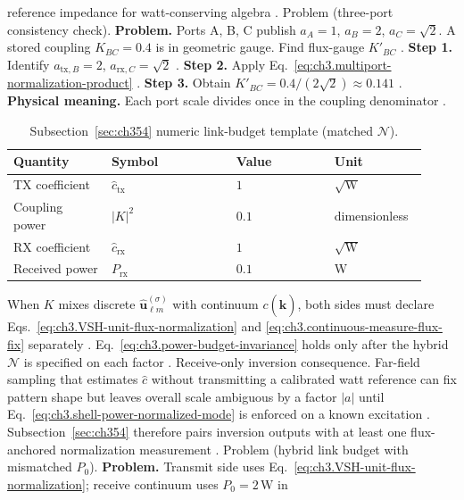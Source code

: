 reference impedance for watt-conserving algebra \cite{harrington2001}.
Problem (three-port consistency check). \textbf{Problem.} Ports A, B, C publish \(a_{A}=1\), \(a_{B}=2\), \(a_{C}=\sqrt{2}\). A stored coupling \(K_{BC}=0.4\) is in
geometric gauge. Find flux-gauge \(K'_{BC}\) \cite{harrington2001}.
\textbf{Step 1.} Identify \(a_{\mathrm{tx},B}=2\), \(a_{\mathrm{rx},C}=\sqrt{2}\) \cite{hansen1988}.
\textbf{Step 2.} Apply Eq.~\eqref{eq:ch3.multiport-normalization-product} \cite{harrington2001}.
\textbf{Step 3.} Obtain \(K'_{BC}=0.4/(2\sqrt{2})\approx0.141\) \cite{stratton1941}.
\textbf{Physical meaning.} Each port scale divides once in the coupling denominator \cite{poynting1884}.
\begin{table}[t]
\centering
\caption{Subsection~\ref{sec:ch354} numeric link-budget template (matched \(\mathcal{N}\)).}
\label{tab:ch3.354-link-budget-numeric}
\small
\begin{tabular}{@{}p{0.22\linewidth}p{0.28\linewidth}p{0.22\linewidth}p{0.20\linewidth}@{}}
\toprule
Quantity & Symbol & Value & Unit \\
\midrule
TX coefficient & $\widehat{c}_{\mathrm{tx}}$ & $1$ & $\sqrt{\mathrm{W}}$ \\
Coupling power & $|K|^{2}$ & $0.1$ & dimensionless \\
RX coefficient & $\widehat{c}_{\mathrm{rx}}$ & $1$ & $\sqrt{\mathrm{W}}$ \\
Received power & $P_{\mathrm{rx}}$ & $0.1$ & W \\
\bottomrule
\end{tabular}
\end{table}
When \(K\) mixes discrete \(\widehat{\mathbf{u}}_{\ell m}^{(\sigma)}\) with continuum \(c(\hat{\mathbf{k}})\), both sides must
declare Eqs.~\eqref{eq:ch3.VSH-unit-flux-normalization} and \eqref{eq:ch3.continuous-measure-flux-fix} separately
\cite{harrington2001}. Eq.~\eqref{eq:ch3.power-budget-invariance} holds only after the hybrid \(\mathcal{N}\) is
specified on each factor \cite{hansen1988}.
Receive-only inversion consequence. Far-field sampling that estimates \(\widehat{c}\) without transmitting a calibrated watt reference can fix pattern shape but leaves
overall scale ambiguous by a factor \(|a|\) until Eq.~\eqref{eq:ch3.shell-power-normalized-mode} is enforced on a known excitation
\cite{devaney2004}. Subsection~\ref{sec:ch354} therefore pairs inversion outputs with at least one
flux-anchored normalization measurement \cite{harrington2001}.
Problem (hybrid link budget with mismatched \(P_{0}\)). \textbf{Problem.} Transmit side uses Eq.~\eqref{eq:ch3.VSH-unit-flux-normalization}; receive continuum uses \(P_{0}=2\,\mathrm{W}\) in
